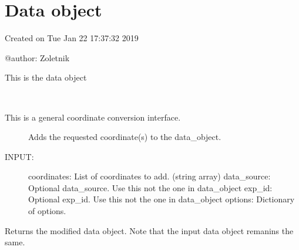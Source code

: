 \documentclass[letterpaper,10pt,english]{sphinxmanual}
\begin{document}
\section{Data object}
\label{\detokenize{data_object:module-flap.data_object}}\label{\detokenize{data_object:data-object}}\label{\detokenize{data_object::doc}}
Created on Tue Jan 22 17:37:32 2019

@author: Zoletnik

\begin{fulllineitems}
\label{\detokenize{data_object:flap.data_object.DataObject}}
This is the data object

\begin{fulllineitems}
\label{\detokenize{data_object:flap.data_object.DataObject.add_coordinate}}~\begin{description}
\item[{This is a general coordinate conversion interface.}] \leavevmode
Adds the requested coordinate(s) to the data\_object.

\item[{INPUT:}] \leavevmode
coordinates: List of coordinates to add. (string array)
data\_source: Optional data\_source. Use this not the one in data\_object
exp\_id: Optional exp\_id. Use this not the one in data\_object
options: Dictionary of options.

\end{description}

Returns the modified data object. Note that the input data object remanins the same.

\end{fulllineitems}



\end{fulllineitems}
\end{document}
